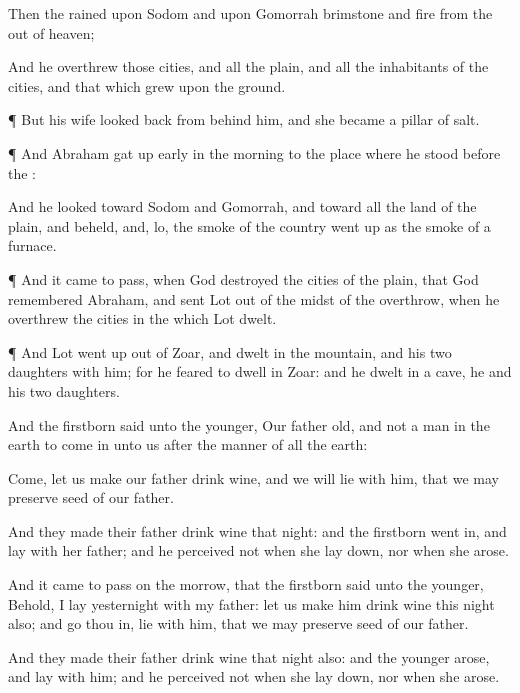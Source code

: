 {\par }{\PP {}Then the
{}
rained upon
Sodom and upon
Gomorrah
brimstone and
fire from the
{} out of
heaven;

And he
overthrew
those
cities, and all the
plain, and all the
inhabitants of the
cities, and that which
grew upon the
ground.


\par }{\PP {}¶ But his
wife looked
back from behind
him, and she became a
pillar of
salt.


\par }{\PP {}¶ And
Abraham gat up
early in the
morning to the
place where he
stood
before the
{}:

And he
looked
toward
Sodom and
Gomorrah, and
toward all the
land of the
plain, and
beheld, and, lo, the
smoke of the
country went
up as the
smoke of a
furnace.


\par }{\PP {}¶ And it came to pass, when
God
destroyed the
cities of the
plain, that
God
remembered
Abraham, and
sent
Lot out of the
midst of the
overthrow, when he
overthrew the
cities in the
which
Lot
dwelt.


\par }{\PP {}¶ And
Lot went
up out of
Zoar, and
dwelt in the
mountain, and his
two
daughters with him; for he
feared to
dwell in
Zoar: and he
dwelt in a
cave, he and his
two
daughters.

And the
firstborn
said unto the
younger, Our
father
{}
old, and
{} not a
man in the
earth to come
in unto us after the
manner of all the
earth:

Come, let us
make our
father
drink
wine, and we will
lie with him, that we may
preserve
seed of our
father.

And they
made their
father
drink
wine that
night: and the
firstborn went
in, and
lay with her
father; and he
perceived not when she lay
down, nor when she
arose.

And it came to pass on the
morrow, that the
firstborn
said unto the
younger, Behold, I
lay
yesternight with my
father: let us make him
drink
wine this
night also; and go thou
in,
{}
lie with him, that we may
preserve
seed of our
father.

And they
made their
father
drink
wine
that
night also: and the
younger
arose, and
lay with him; and he
perceived not when she lay
down, nor when she
arose.

}
